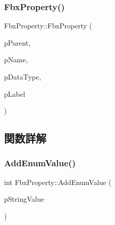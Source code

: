 \mbox{\label{class_fbx_property_a019739c19f5652349afb9780945e57f0}} 
\subsubsection{\texorpdfstring{Fbx\+Property()}{FbxProperty()}\hspace{0.1cm}{\footnotesize\ttfamily [5/5]}}
{\footnotesize\ttfamily Fbx\+Property\+::\+Fbx\+Property (\begin{DoxyParamCaption}\item[{const \hyperlink{class_fbx_property}{Fbx\+Property} \&}]{p\+Parent,  }\item[{const char $\ast$}]{p\+Name,  }\item[{const \hyperlink{class_fbx_data_type}{Fbx\+Data\+Type} \&}]{p\+Data\+Type,  }\item[{const char $\ast$}]{p\+Label }\end{DoxyParamCaption})\hspace{0.3cm}{\ttfamily [protected]}}



\subsection{関数詳解}
\mbox{\label{class_fbx_property_aa25239a939eb238e2eb239040364e286}} 
\subsubsection{\texorpdfstring{Add\+Enum\+Value()}{AddEnumValue()}}
{\footnotesize\ttfamily int Fbx\+Property\+::\+Add\+Enum\+Value (\begin{DoxyParamCaption}\item[{const char $\ast$}]{p\+String\+Value }\end{DoxyParamCaption})}

